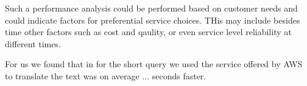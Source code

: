 Such a performance analysis could be performed based on customer needs
and could indicate factors for preferential service choices. THis may
include besides time other factors such as cost and qaulity, or even
service level reliability at different times.

For us we found that in for the short query we used the service
offered by AWS to translate the text was on average ...  seconds faster.



